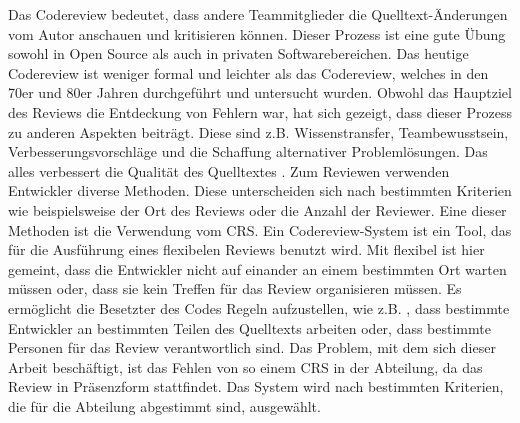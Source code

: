 
Das Codereview bedeutet, dass andere Teammitglieder die Quelltext-Änderungen vom Autor anschauen und kritisieren können. Dieser Prozess ist eine gute Übung sowohl in Open Source als auch in privaten Softwarebereichen. Das heutige Codereview ist weniger formal und leichter als das Codereview, welches in den 70er und 80er Jahren durchgeführt und untersucht wurden. Obwohl das Hauptziel des Reviews die Entdeckung von Fehlern war, hat sich gezeigt, dass dieser Prozess zu anderen Aspekten beiträgt. Diese sind z.B.  Wissenstransfer, Teambewusstsein, Verbesserungsvorschläge und die Schaffung alternativer Problemlösungen. Das alles verbessert die Qualität des Quelltextes \cite{bacchelli2013expectations}.
Zum Reviewen verwenden Entwickler diverse Methoden. Diese unterscheiden sich nach bestimmten Kriterien wie beispielsweise der Ort des Reviews oder die Anzahl der Reviewer. Eine dieser Methoden ist die Verwendung vom \ac{CRS}.
Ein Codereview-System ist ein Tool, das für die Ausführung eines flexibelen Reviews benutzt wird. Mit flexibel ist hier gemeint, dass die Entwickler nicht auf einander an einem bestimmten Ort warten müssen oder, dass sie kein Treffen für das Review organisieren müssen. Es ermöglicht die Besetzter des Codes Regeln aufzustellen, wie z.B. , dass bestimmte Entwickler an bestimmten Teilen des Quelltexts arbeiten oder, dass bestimmte Personen für das Review verantwortlich sind. Das Problem, mit dem sich dieser Arbeit beschäftigt, ist das Fehlen von so einem \ac{CRS} in der Abteilung, da das Review in Präsenzform stattfindet. Das System wird nach bestimmten Kriterien, die für die Abteilung abgestimmt sind, ausgewählt.